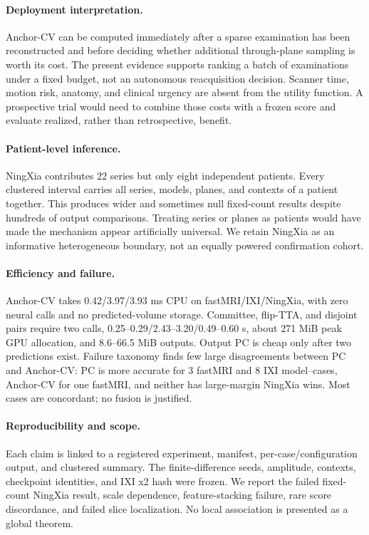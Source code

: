 \documentclass[10pt,twocolumn,letterpaper]{article}
\begin{document}
\paragraph{Deployment interpretation.} Anchor-CV can be computed immediately after a sparse examination has been reconstructed and before deciding whether additional through-plane sampling is worth its cost. The present evidence supports ranking a batch of examinations under a fixed budget, not an autonomous reacquisition decision. Scanner time, motion risk, anatomy, and clinical urgency are absent from the utility function. A prospective trial would need to combine those costs with a frozen score and evaluate realized, rather than retrospective, benefit.

\paragraph{Patient-level inference.} NingXia contributes 22 series but only eight independent patients. Every clustered interval carries all series, models, planes, and contexts of a patient together. This produces wider and sometimes null fixed-count results despite hundreds of output comparisons. Treating series or planes as patients would have made the mechanism appear artificially universal. We retain NingXia as an informative heterogeneous boundary, not an equally powered confirmation cohort.

\paragraph{Efficiency and failure.} Anchor-CV takes 0.42/3.97/3.93 ms CPU on fastMRI/IXI/NingXia, with zero neural calls and no predicted-volume storage. Committee, flip-TTA, and disjoint pairs require two calls, 0.25--0.29/2.43--3.20/0.49--0.60 s, about 271 MiB peak GPU allocation, and 8.6--66.5 MiB outputs. Output PC is cheap only after two predictions exist. Failure taxonomy finds few large disagreements between PC and Anchor-CV: PC is more accurate for 3 fastMRI and 8 IXI model--cases, Anchor-CV for one fastMRI, and neither has large-margin NingXia wins. Most cases are concordant; no fusion is justified.

\paragraph{Reproducibility and scope.} Each claim is linked to a registered experiment, manifest, per-case/configuration output, and clustered summary. The finite-difference seeds, amplitude, contexts, checkpoint identities, and IXI x2 hash were frozen. We report the failed fixed-count NingXia result, scale dependence, feature-stacking failure, rare score discordance, and failed slice localization. No local association is presented as a global theorem.
\end{document}
